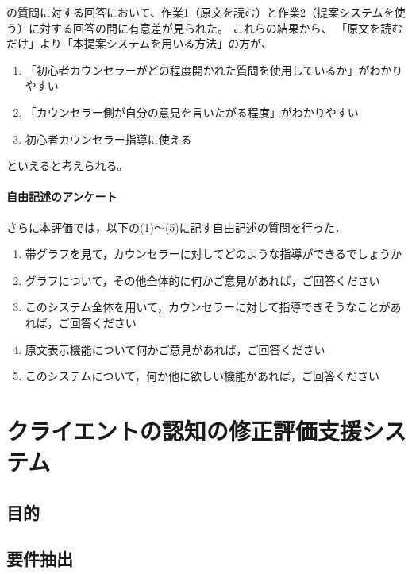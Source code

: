 \documentclass[shuuron]{kuee}
\begin{document}
の質問に対する回答において、作業1（原文を読む）と作業2（提案システムを使う）に対する回答の間に有意差が見られた。
これらの結果から、
「原文を読むだけ」より「本提案システムを用いる方法」の方が、
\begin{enumerate}

  \item 「初心者カウンセラーがどの程度開かれた質問を使用しているか」がわかりやすい
  \item 「カウンセラー側が自分の意見を言いたがる程度」がわかりやすい
  \item 初心者カウンセラー指導に使える
\end{enumerate}
といえると考えられる。


\subsubsection{自由記述のアンケート}


さらに本評価では，以下の(1)～(5)に記す自由記述の質問を行った．



\begin{enumerate}
  \item 帯グラフを見て，カウンセラーに対してどのような指導ができるでしょうか
  \item グラフについて，その他全体的に何かご意見があれば，ご回答ください
  \item このシステム全体を用いて，カウンセラーに対して指導できそうなことがあれば，ご回答ください
  \item 原文表示機能について何かご意見があれば，ご回答ください
  \item このシステムについて，何か他に欲しい機能があれば，ご回答ください
\end{enumerate}









\chapter{クライエントの認知の修正評価支援システム}
\section{目的}


\section{要件抽出}
\end{document}

